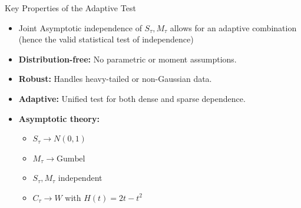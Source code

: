 \documentclass[
  ignorenonframetext,
]{beamer}
\providecommand{\tightlist}{%
  \setlength{\itemsep}{0pt}\setlength{\parskip}{0pt}}
\begin{document}
\begin{frame}{Key Properties of the Adaptive Test}
\label{key-properties-of-the-adaptive-test}
\begin{itemize}
\tightlist
\item
  Joint Asymptotic independence of \(S_{\tau}, M_{\tau}\) allows for an
  adaptive combination (hence the valid statistical test of
  independence)
\item
  \textbf{Distribution-free:} No parametric or moment assumptions.\\
\item
  \textbf{Robust:} Handles heavy-tailed or non-Gaussian data.\\
\item
  \textbf{Adaptive:} Unified test for both dense and sparse
  dependence.\\
\item
  \textbf{Asymptotic theory:}

  \begin{itemize}
  \tightlist
  \item
    \(S_\tau \to N(0,1)\)\\
  \item
    \(M_\tau \to \text{Gumbel}\)\\
  \item
    \(S_\tau, M_\tau\) independent\\
  \item
    \(C_\tau \to W\) with \(H(t) = 2t - t^2\)
  \end{itemize}
\end{itemize}
\end{frame}
\end{document}
